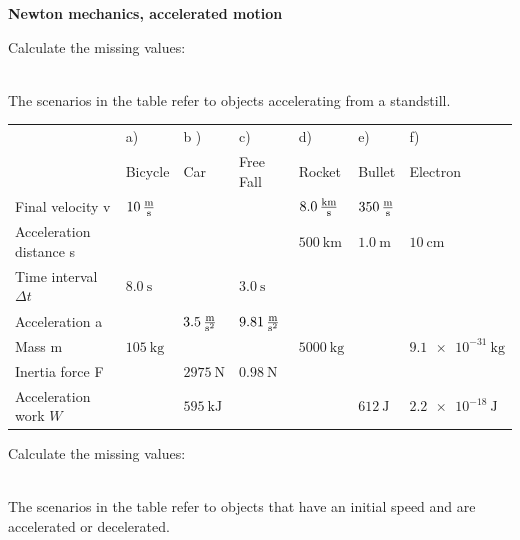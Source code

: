 \documentclass[a4paper]{article}
\begin{document}
	{\bf Newton mechanics, accelerated motion}
	\begin{enumerate}[1.]
		{\bf \item Calculate the missing values:}\\
		The scenarios in the table refer to objects accelerating from a standstill.
		
		\renewcommand{\arraystretch}{2}
		\begin{tabular}{|p{4 cm}|p{1.6 cm}|p{1.8 cm}|p{1.8 cm}|p{1.8 cm}|p{1.8 cm}|p{2.0 cm}|}
			\hline
			&a) & b ) & c) & d) & e) & f) \\
			& Bicycle & Car & Free Fall & Rocket & Bullet & Electron \\
			\hline
			Final velocity v & $\SI{10}{\meter\over \second}$& & & $\SI{8,0}{\kilo\meter\over \second}$& $\SI{350}{\meter \over \second}$& \\
			\hline
			Acceleration distance s & & & &$\SI{500}{\kilo\meter}$ & $\SI{1.0}{\meter}$&$\SI{10}{\centi\meter}$ \\
			\hline
			Time interval $\Delta t$ & $\SI{8.0}{\second}$ & & $\SI{3.0}{\second}$& & & \\
			\hline
			Acceleration a & & $\SI{3.5}{\meter\over{\second^2}}$ &$\SI{9.81}{\meter\over{\second^2}}$ & & & \\
			\hline
			Mass m & $\SI{105}{\kilogram}$ & & & $\SI{5000}{\kilogram}$ && $\SI{9,1e-31}{\kilogram}$\\
			\hline
			Inertia force F & & $\SI{2975}{\newton}$ &$\SI{0.98}{\newton}$ & & & \\
			\hline
			Acceleration work $W$ & & $\SI{595}{\kilo\joule}$ & & &$\SI{612}{\joule}$ &$\SI{2.2e-18}{\joule}$ \\
			\hline
		\end{tabular}
		
		{\bf \item Calculate the missing values:}\\
		The scenarios in the table refer to objects that have an initial speed and are accelerated or decelerated.
		

\end{enumerate}
\end{document}
